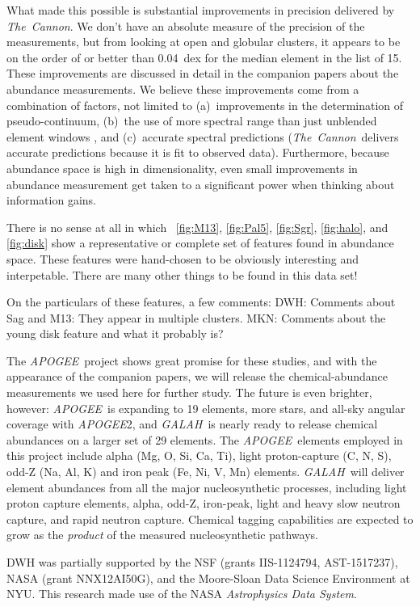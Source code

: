 \documentclass[12pt, letterpaper, preprint]{aastex}
\newcommand{\acronym}[1]{{\small{#1}}}
\newcommand{\project}[1]{\textsl{#1}}
\newcommand{\apogee}{\project{\acronym{APOGEE}}}
\newcommand{\galah}{\project{\acronym{GALAH}}}
\newcommand{\thecannon}{\project{The~Cannon}}
\begin{document}
What made this possible is substantial improvements in precision
delivered by \thecannon.
We don't have an absolute measure of the precision of the measurements,
but from looking at open and globular clusters, it appears to be on the
order of or better than 0.04~dex for the median element in the list of 15.
These improvements are discussed in detail in the companion papers
\citep{casey16, ness16} about the abundance measurements.
We believe these improvements come from a combination of factors, not
limited to (a)~improvements in the determination of pseudo-continuum,
(b)~the use of more spectral range than just unblended element windows
\citep{aspcap}, and (c)~accurate spectral predictions
(\thecannon\ delivers accurate predictions because it is fit to
observed data).
Furthermore, because abundance space is high in dimensionality, even
small improvements in abundance measurement get taken to a significant
power when thinking about information gains.

There is no sense at all in which \figurename~\ref{fig:M13},
\ref{fig:Pal5}, \ref{fig:Sgr}, \ref{fig:halo}, and \ref{fig:disk} show
a representative or complete set of features found in abundance space.
These features were hand-chosen to be obviously interesting and
interpetable.
There are many other things to be found in this data set!

On the particulars of these features, a few comments:
DWH: Comments about Sag and M13: They appear in multiple clusters.
MKN: Comments about the young disk feature and what it probably is?

The \apogee\ project shows great promise for these studies, and with
the appearance of the companion papers, we will release the
chemical-abundance measurements we used here for further study.
The future is even brighter, however: \apogee\ is expanding to 19
elements, more stars, and all-sky angular coverage with \apogee2, and
\galah\ is nearly ready to release chemical abundances on a larger set
of 29 elements.
The \apogee\ elements employed in this project include alpha
(Mg, O, Si, Ca, Ti), light proton-capture (C, N, S), odd-Z (Na, Al, K)
and iron peak (Fe, Ni, V, Mn) elements.
\galah\ will deliver element abundances from all the major
nucleosynthetic processes, including light proton capture elements,
alpha, odd-Z, iron-peak, light and heavy slow neutron capture, and
rapid neutron capture.
Chemical tagging capabilities are expected to grow as the
\emph{product} of the measured nucleosynthetic pathways.

\acknowledgements
DWH was partially supported by
  the NSF (grants IIS-1124794, AST-1517237),
  NASA (grant NNX12AI50G), and
  the Moore-Sloan Data Science Environment at NYU.
This research made use of the NASA \project{Astrophysics Data System}.
\end{document}
